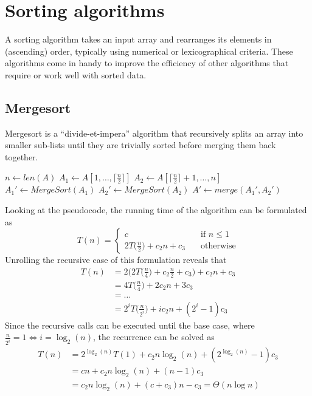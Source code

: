 \documentclass{report}
\begin{document}
\section{Sorting algorithms}
A sorting algorithm takes an input array and rearranges its elements in (ascending) order, typically using numerical or lexicographical criteria. \newline
These algorithms come in handy to improve the efficiency of other algorithms that require or work well with sorted data.
\subsection{Mergesort}
Mergesort is a ``divide-et-impera'' algorithm that recursively splits an array into smaller sub-lists until they are trivially sorted before merging them back together.

\begin{algorithm}[H]
    \caption{The Mergesort algorithm.}
    
    $n \gets len(A)$\;
    $A_1 \gets A[1, \dots, \lceil\frac{n}{2}\rceil]$\;
    $A_2 \gets A[\lceil\frac{n}{2}\rceil + 1, \dots, n]$\;
    $A_1' \gets MergeSort(A_1)$\;
    $A_2' \gets MergeSort(A_2)$\;
    $A' \gets merge(A_1', A_2')$\;
    \;
\end{algorithm}
\noindent Looking at the pseudocode, the running time of the algorithm can be formulated as
\[T(n) = \begin{cases}
    c &\quad\text{if $n \leq 1$} \\
    2T\big(\frac{n}{2}\big) + c_2n + c_3 &\quad\text{otherwise}
\end{cases}\]
Unrolling the recursive case of this formulation reveals that
\begin{align*}
    T(n) &= 2\bigg(2T\bigg(\frac{n}{4}\bigg) + c_2\frac{n}{2} + c_3\bigg) + c_2n + c_3 \\
         &= 4T\bigg(\frac{n}{4}\bigg) + 2c_2n + 3c_3 \\
         &= \dots \\
         &= 2^iT\bigg(\frac{n}{2^i}\bigg) + ic_2n + (2^i - 1)c_3
\end{align*}
Since the recursive calls can be executed until the base case, where $\displaystyle \frac{n}{2^i} = 1 \Leftrightarrow i = \log_2(n)$, the recurrence can be solved as
\begin{align*}
    T(n) &= 2^{\log_2(n)}T(1) + c_2n\log_2(n) + (2^{\log_2(n)} - 1)c_3 \\
         &= cn + c_2n\log_2(n) + (n - 1)c_3 \\
         &= c_2n\log_2(n) + (c + c_3)n - c_3 = \Theta(n\log n)
\end{align*}
\end{document}
